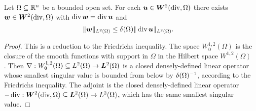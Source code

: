 \documentclass[10pt,a4paper]{article}
\begin{document}
\begin{lemma}\label{lemma:PFfordivergence}
    Let $\Omega \subseteq {\mathbb R}^{n}$ be a bounded open set. 
    For each $\bm{u} \in \bm{W}^{2}(\operatorname{div},\Omega)$ there exists $\bm{w} \in \bm{W}^{2}(\operatorname{div},\Omega)$ with $\operatorname{div} \bm{w} = \operatorname{div} \bm{u}$ and 
    \begin{align*}
        \| \bm{w} \|_{L^{2}(\Omega)} 
        \leq 
        {\delta}(\Omega) \| \operatorname{div} \bm{u} \|_{L^{2}(\Omega)}
        .
    \end{align*}
\end{lemma}
\begin{proof}
    This is a reduction to the Friedrichs inequality. 
    The space $W^{1,2}_{0}(\Omega)$ is the closure of the smooth functions with support in $\Omega$ in the Hilbert space $W^{1,2}(\Omega)$. 
    Then $\nabla : W^{1,2}_{0}(\Omega) \subseteq L^{2}(\Omega) \rightarrow \bm{L}^{2}(\Omega)$ is a closed densely-defined linear operator 
    whose smallest singular value is bounded from below by ${\delta}(\Omega)^{-1}$, according to the Friedrichs inequality. 
    The adjoint is the closed densely-defined linear operator $-\operatorname{div} : \bm{W}^{2}(\operatorname{div},\Omega) \subseteq \bm{L}^{2}(\Omega) \rightarrow L^{2}(\Omega)$,
    which has the same smallest singular value. 
\end{proof}
\end{document}
